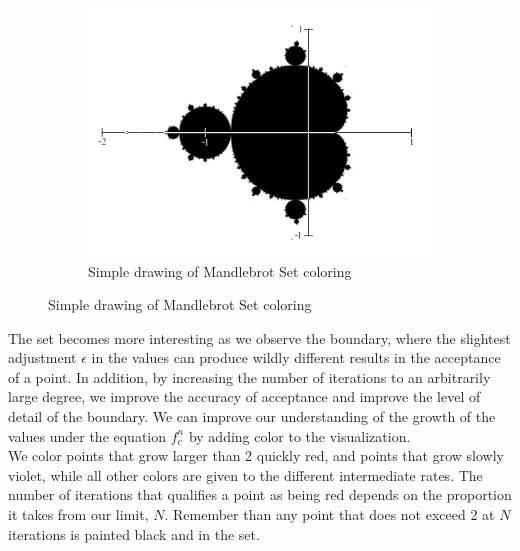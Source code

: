 \documentclass[20pt]{article} %
\begin{document}
\begin{figure}[!htbp]
  	\centering
   	\begin{subfigure}[p]{0.5\linewidth}
    	\includegraphics[width=\linewidth]{./figures/Mandelset_simple.png}
	\caption{Simple drawing of Mandlebrot Set coloring}
	\label{fig:sub1}
   	\end{subfigure}
\end{figure} 

The set becomes more interesting as we observe the boundary, where the slightest adjustment $\epsilon$ in the values can produce wildly different results in the acceptance of a point. In addition, by increasing the number of iterations to an arbitrarily large degree, we improve the accuracy of acceptance and improve the level of detail of the boundary.  We can improve our understanding of the growth of the values under the equation $f_c^{n}$ by adding color to the visualization. \\ 

We color points that grow larger than 2 quickly red, and points that grow slowly violet, while all other colors are given to the different intermediate rates.  The number of iterations that qualifies a point as being red depends on the proportion it takes from our limit, $N$.  Remember than any point that does not exceed 2 at $N$ iterations is painted black and in the set.
\end{document}
